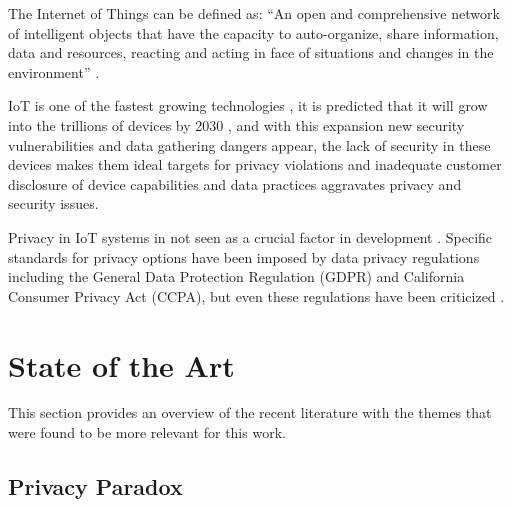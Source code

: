 \documentclass[manuscript,natbib=false]{acmart}
\begin{document}

The Internet of Things can be defined as: ``An open and comprehensive network
of intelligent objects that have the capacity to auto-organize, share information,
data and resources, reacting and acting in face of situations and changes
in the environment'' \cite{madakam2015internet}.

IoT is one of the fastest growing technologies \cite{MohammadState}, it
is predicted that it will grow into the trillions of devices by 2030 \cite{SarawiInternet},
and with this expansion new security vulnerabilities and data gathering
dangers appear, the lack of security in these devices makes them ideal targets
for privacy violations and inadequate customer disclosure of device capabilities
and data practices aggravates privacy and security issues.

Privacy in IoT systems in not seen as a crucial factor in development \cite{alhirabi2021security}.
Specific standards for privacy options have been imposed by data privacy
regulations including the General Data Protection Regulation (GDPR) and
California Consumer Privacy Act (CCPA), but even these regulations have
been criticized \cite{peloquin2020disruptive, gladis2022weaponizing, gentile2022deficient, green2022flaws, byun2019privacy}.

\section{State of the Art}

\par
This section provides an overview of the recent literature with the themes
that were found to be more relevant for this work.

\subsection{Privacy Paradox}
\end{document}
